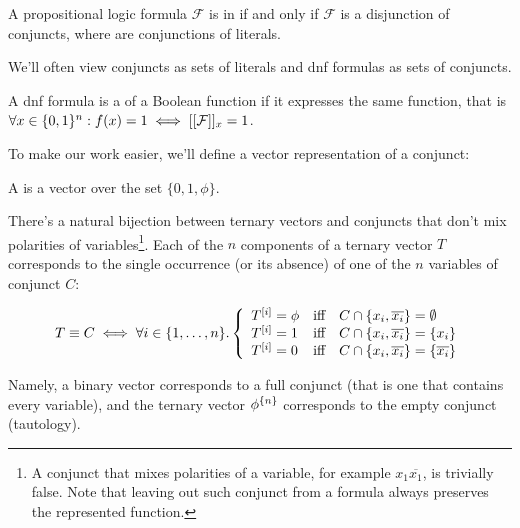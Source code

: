 
\begin{definition}
A propositional logic formula $\mathcal{F}$
is in  if and only if
$\mathcal{F}$ is a disjunction of conjuncts,
where  are conjunctions of literals.

We'll often view conjuncts as sets of literals
and \acrshort{dnf} formulas as sets of conjuncts.
\end{definition}

A \acrshort{dnf} formula is
a 
of a Boolean function
if it expresses the same function,
that is
$\forall x \in \{0, 1\}^n: f(x) = 1 \iff
[[\mathcal{F}]]_{x} = 1$.

To make our work easier,
we'll define a vector representation of a conjunct:

\begin{definition}
A 
is a vector over the set
$\{0, 1, \phi\}$.
\end{definition}

There's a natural bijection between ternary vectors
and conjuncts that don't mix polarities of variables\footnote{A conjunct
that mixes polarities of a variable,
for example $x_1 \overline{x_1}$,
is trivially false.
Note that leaving out such conjunct from a formula
always preserves the represented function.}.
Each of the $n$ components of a ternary vector $T$
corresponds to the single occurrence (or its absence)
of one of the $n$ variables of conjunct $C$:

\[
T \equiv C \iff \forall i \in \{1, \ldots, n\}.
\left\{
  \begin{array}{lll}
    T^{[i]} = \phi & \text{iff} & C \cap \{x_i, \overline{x_i}\} = \emptyset \\
    T^{[i]} = 1 & \text{iff} & C \cap \{x_i, \overline{x_i}\} = \{x_i\} \\
    T^{[i]} = 0 & \text{iff} & C \cap \{x_i, \overline{x_i}\} = \{\overline{x_i}\}
  \end{array}
\right.
\]

Namely,
a binary vector corresponds to a full conjunct
(that is one that contains every variable),
and the ternary vector $\phi^{\{n\}}$
corresponds to the empty conjunct (tautology).

